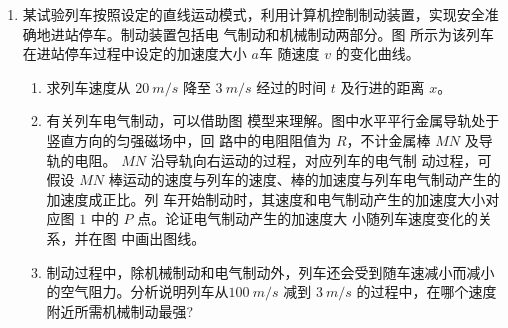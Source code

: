 \begin{enumerate}



\newpage
\item 
某试验列车按照设定的直线运动模式，利用计算机控制制动装置，实现安全准确地进站停车。制动装置包括电
气制动和机械制动两部分。图  所示为该列车在进站停车过程中设定的加速度大小 $ a $车 随速度 $ v $ 的变化曲线。
\begin{enumerate}
\item
求列车速度从 $ 20 \ m/s $ 降至 $ 3 \ m/s $ 经过的时间 $ t $ 及行进的距离 $ x $。
\item 
有关列车电气制动，可以借助图  模型来理解。图中水平平行金属导轨处于竖直方向的匀强磁场中，回
路中的电阻阻值为 $ R $，不计金属棒 $ MN $ 及导轨的电阻。 $ MN $ 沿导轨向右运动的过程，对应列车的电气制
动过程，可假设 $ MN $ 棒运动的速度与列车的速度、棒的加速度与列车电气制动产生的加速度成正比。列
车开始制动时，其速度和电气制动产生的加速度大小对应图 $ 1 $ 中的 $ P $ 点。论证电气制动产生的加速度大
小随列车速度变化的关系，并在图 中画出图线。

\item 
制动过程中，除机械制动和电气制动外，列车还会受到随车速减小而减小的空气阻力。分析说明列车从$ 100 \ m/s $ 减到 $ 3 \ m/s $ 的过程中，在哪个速度附近所需机械制动最强?



\end{enumerate}
\end{enumerate}
